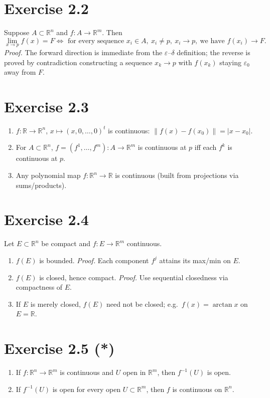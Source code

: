 \documentclass[11pt,a4paper]{article}
\begin{document}
\section*{Exercise 2.2}
Suppose $A\subset\mathbb{R}^n$ and $f:A\to\mathbb{R}^m$. Then
\[
\lim_{x\to p}f(x)=F \iff \text{ for every sequence } x_i\in A,\ x_i\neq p,\ x_i\to p,\ \text{we have } f(x_i)\to F.
\]
\textit{Proof.} The forward direction is immediate from the $\varepsilon$--$\delta$ definition; the reverse is proved by contradiction constructing a sequence $x_k\to p$ with $f(x_k)$ staying $\varepsilon_0$ away from $F$.

\section*{Exercise 2.3}
\begin{enumerate}
\renewcommand\labelenumi{(\alph{enumi})}
\item $f:\mathbb{R}\to\mathbb{R}^n$, $x\mapsto (x,0,\dots,0)^t$ is continuous: $\|f(x)-f(x_0)\|=|x-x_0|$.
\item For $A\subset\mathbb{R}^n$, $f=(f^1,\dots,f^m):A\to\mathbb{R}^m$ is continuous at $p$ iff each $f^k$ is continuous at $p$.
\item Any polynomial map $f:\mathbb{R}^n\to\mathbb{R}$ is continuous (built from projections via sums/products).
\end{enumerate}

\section*{Exercise 2.4}
Let $E\subset\mathbb{R}^n$ be compact and $f:E\to\mathbb{R}^m$ continuous.
\begin{enumerate}
\renewcommand\labelenumi{(\alph{enumi})}
\item $f(E)$ is bounded. \textit{Proof.} Each component $f^j$ attains its max/min on $E$.
\item $f(E)$ is closed, hence compact. \textit{Proof.} Use sequential closedness via compactness of $E$.
\item If $E$ is merely closed, $f(E)$ need not be closed; e.g.\ $f(x)=\arctan x$ on $E=\mathbb{R}$.
\end{enumerate}

\section*{Exercise 2.5 (*)}
\begin{enumerate}
\renewcommand\labelenumi{(\alph{enumi})}
\item If $f:\mathbb{R}^n\to\mathbb{R}^m$ is continuous and $U$ open in $\mathbb{R}^m$, then $f^{-1}(U)$ is open.
\item If $f^{-1}(U)$ is open for every open $U\subset\mathbb{R}^m$, then $f$ is continuous on $\mathbb{R}^n$.
\end{enumerate}
\end{document}
